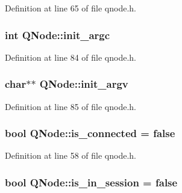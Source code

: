 Definition at line 65 of file qnode.\+h.

\subsubsection[{\texorpdfstring{init\+\_\+argc}{init_argc}}]{\setlength{\rightskip}{0pt plus 5cm}int Q\+Node\+::init\+\_\+argc\hspace{0.3cm}{\ttfamily [protected]}}\hypertarget{class_q_node_aa0c7569195d8b9a6e568e98097f11d52}{}\label{class_q_node_aa0c7569195d8b9a6e568e98097f11d52}


Definition at line 84 of file qnode.\+h.

\subsubsection[{\texorpdfstring{init\+\_\+argv}{init_argv}}]{\setlength{\rightskip}{0pt plus 5cm}char$\ast$$\ast$ Q\+Node\+::init\+\_\+argv\hspace{0.3cm}{\ttfamily [protected]}}\hypertarget{class_q_node_a92c2972e3dd2a5de95d0edf8c75e1e5f}{}\label{class_q_node_a92c2972e3dd2a5de95d0edf8c75e1e5f}


Definition at line 85 of file qnode.\+h.

\subsubsection[{\texorpdfstring{is\+\_\+connected}{is_connected}}]{\setlength{\rightskip}{0pt plus 5cm}bool Q\+Node\+::is\+\_\+connected = false}\hypertarget{class_q_node_a98b08e7704b00df8648f8c08dffe950c}{}\label{class_q_node_a98b08e7704b00df8648f8c08dffe950c}


Definition at line 58 of file qnode.\+h.

\subsubsection[{\texorpdfstring{is\+\_\+in\+\_\+session}{is_in_session}}]{\setlength{\rightskip}{0pt plus 5cm}bool Q\+Node\+::is\+\_\+in\+\_\+session = false}\hypertarget{class_q_node_a6ace2d0aa89adecfe699b3f1c3ce0b0f}{}\label{class_q_node_a6ace2d0aa89adecfe699b3f1c3ce0b0f}


